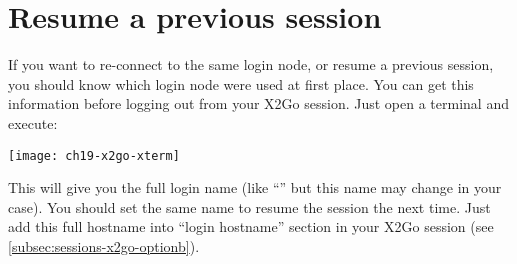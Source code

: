 \section{Resume a previous session}
\label{sec:re-connect-x2go}

If you want to re-connect to the same login node, or resume a previous session, you should know which login node were used at first place. You can get this information before logging out from your X2Go session. Just open a terminal and execute: 

\begin{prompt}
\end{prompt}

\texttt{[image: ch19-x2go-xterm]}

This will give you the full login name (like ``\strong{\emph{\loginhost{}}}'' but this name may change in your case). You should set the same name to resume the  session the next time. Just add this full hostname into ``login hostname'' section in your X2Go session (see \autoref{subsec:sessions-x2go-optionb}).
